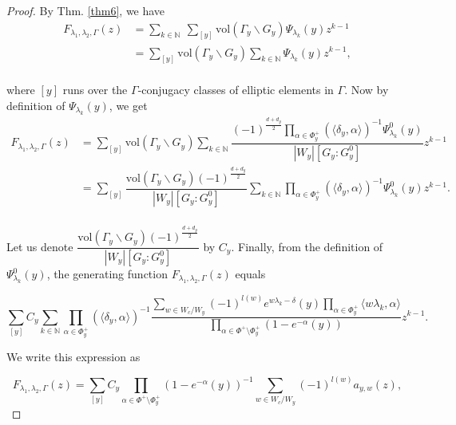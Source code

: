 \documentclass[10pt,a4paper]{amsart}
\newcommand{\N}{{\mathbb N}}
\begin{document}
\begin{proof}
 By Thm. \ref{thm6}, we have 
\begin{equation}
\begin{split}
 F_{\lambda_1, \lambda_2, \Gamma}(z)
& = \sum\limits_{k \in \N}\ \sum\limits_{[y]} \text{vol} ( \Gamma_y \backslash G_y) \Psi_{\lambda_k}(y) z^{k-1}\\ 
& = \sum\limits_{[y]} \text{vol} (\Gamma_y \backslash G_y) \sum\limits_{k \in \N} \Psi_{\lambda_k} (y) z^{k-1},\\ 
\end{split}
\end{equation}

\noindent where $[y]$ runs over the $\Gamma$-conjugacy classes of elliptic elements in $\Gamma$. Now by definition of $\Psi_{\lambda_k}(y)$, we get 
\begin{equation}
\begin{split}
F_{\lambda_1, \lambda_2, \Gamma}(z)
& = \sum\limits_{[y]} \text{vol} (\Gamma_y \backslash G_y) \sum\limits_{k \in \N} \dfrac{ (-1)^{\tfrac{d + d_y}{2}} \prod\limits_{\alpha \in \Phi_y^+} \left(\langle \delta_y, \alpha \rangle \right) ^{-1} \Psi_{\lambda_k}^0(y)}{|W_y| [G_y : G_y^0]} z^{k-1}\\
& = \sum\limits_{[y]} \dfrac{\text{vol} (\Gamma_y \backslash G_y) (-1)^{\tfrac{d + d_y}{2}}}{|W_y| [G_y : G_y^0]} \sum\limits_{k \in \N} \prod\limits_{\alpha \in \Phi_y^+} \left(\langle \delta_y , \alpha \rangle\right) ^{-1} \Psi_{\lambda_k}^0(y) z^{k-1}.\\
\end{split}
\end{equation}

\noindent Let us denote $\dfrac{\text{vol}(\Gamma_y \backslash G_y) (-1)^{\frac{d+ d_y}{2}}}{|W_y| [ G_y : G_y^0]}$ by $C_y$. Finally, from the definition of $\Psi_{\lambda_k}^0(y)$, the generating function $F_{\lambda_1, \lambda_2, \Gamma}(z)$ equals

$$\sum\limits_{[y]} C_y \sum\limits_{k \in \N} \prod_{\alpha \in \Phi_y^+} (\langle \delta_y , \alpha \rangle) ^{-1} \dfrac{\sum\limits_{w \in W_c / W_y} (-1)^{l(w)} e ^{w \lambda_k -\delta}(y) \prod\limits_{\alpha \in \Phi_y^+} \langle w \lambda_k, \alpha \rangle}{\prod\limits_{\alpha \in \Phi^+ \setminus \Phi_y^+} (1 - e^{-\alpha}(y))}z^{k-1}.$$ 

\noindent We write this expression as 

$$F_{\lambda_1, \lambda_2, \Gamma}(z)= \sum\limits_{[y]} C_y \prod\limits_{\alpha \in \Phi^+ \setminus \Phi_y^+}(1 - e ^{-\alpha}(y))^{-1} \sum\limits_{w \in W_c / W_y} (-1)^{l(w)} a_{y, w}(z),$$


\end{proof}
\end{document}
